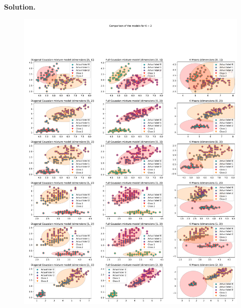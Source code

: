 \documentclass[a4paper, 11pt]{article}
\begin{document}
\begin{enumerate}
        \textbf{Solution.}\\
        \begin{figure}
            \centering
            \includegraphics[width=1\textwidth]{probabilistic_graphical_models/HW2/images/iris_GM_KM_2.pdf}
            \caption{}
            \label{fig:iris2}
        \end{figure}
        

\end{enumerate}
\end{document}
